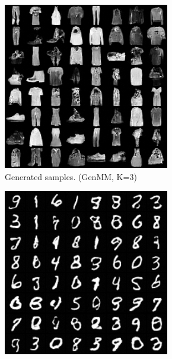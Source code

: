 \begin{figure}[!t]
\begin{subfigure}[b]{0.24\textwidth}
    \includegraphics[width=1\linewidth]{images/fashion-mnist/samples/gene_c3_std1_samples.png}
    \caption{Generated samples. (GenMM, K=3)}
  \end{subfigure}
  \begin{subfigure}[b]{0.24\textwidth}
    \centering
    \includegraphics[width=1\linewidth]{images/mnist/samples/gen_LatMM_K3_std088.png}

\end{subfigure}
\end{figure}
